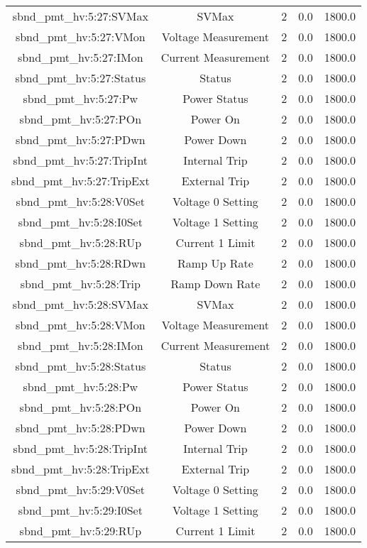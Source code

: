 \begin{table}[ptb]
\begin{tabular}{c | c c c c}
sbnd_pmt_hv:5:27:SVMax & SVMax & 2 & 0.0 & 1800.0\\ 
sbnd_pmt_hv:5:27:VMon & Voltage Measurement & 2 & 0.0 & 1800.0\\ 
sbnd_pmt_hv:5:27:IMon & Current Measurement & 2 & 0.0 & 1800.0\\ 
sbnd_pmt_hv:5:27:Status & Status & 2 & 0.0 & 1800.0\\ 
sbnd_pmt_hv:5:27:Pw & Power Status & 2 & 0.0 & 1800.0\\ 
sbnd_pmt_hv:5:27:POn & Power On & 2 & 0.0 & 1800.0\\ 
sbnd_pmt_hv:5:27:PDwn & Power Down & 2 & 0.0 & 1800.0\\ 
sbnd_pmt_hv:5:27:TripInt & Internal Trip & 2 & 0.0 & 1800.0\\ 
sbnd_pmt_hv:5:27:TripExt & External Trip & 2 & 0.0 & 1800.0\\ 
sbnd_pmt_hv:5:28:V0Set & Voltage 0 Setting & 2 & 0.0 & 1800.0\\ 
sbnd_pmt_hv:5:28:I0Set & Voltage 1 Setting & 2 & 0.0 & 1800.0\\ 
sbnd_pmt_hv:5:28:RUp & Current 1 Limit & 2 & 0.0 & 1800.0\\ 
sbnd_pmt_hv:5:28:RDwn & Ramp Up Rate & 2 & 0.0 & 1800.0\\ 
sbnd_pmt_hv:5:28:Trip & Ramp Down Rate & 2 & 0.0 & 1800.0\\ 
sbnd_pmt_hv:5:28:SVMax & SVMax & 2 & 0.0 & 1800.0\\ 
sbnd_pmt_hv:5:28:VMon & Voltage Measurement & 2 & 0.0 & 1800.0\\ 
sbnd_pmt_hv:5:28:IMon & Current Measurement & 2 & 0.0 & 1800.0\\ 
sbnd_pmt_hv:5:28:Status & Status & 2 & 0.0 & 1800.0\\ 
sbnd_pmt_hv:5:28:Pw & Power Status & 2 & 0.0 & 1800.0\\ 
sbnd_pmt_hv:5:28:POn & Power On & 2 & 0.0 & 1800.0\\ 
sbnd_pmt_hv:5:28:PDwn & Power Down & 2 & 0.0 & 1800.0\\ 
sbnd_pmt_hv:5:28:TripInt & Internal Trip & 2 & 0.0 & 1800.0\\ 
sbnd_pmt_hv:5:28:TripExt & External Trip & 2 & 0.0 & 1800.0\\ 
sbnd_pmt_hv:5:29:V0Set & Voltage 0 Setting & 2 & 0.0 & 1800.0\\ 
sbnd_pmt_hv:5:29:I0Set & Voltage 1 Setting & 2 & 0.0 & 1800.0\\ 
sbnd_pmt_hv:5:29:RUp & Current 1 Limit & 2 & 0.0 & 1800.0\\ 

\end{tabular}
\end{table}
